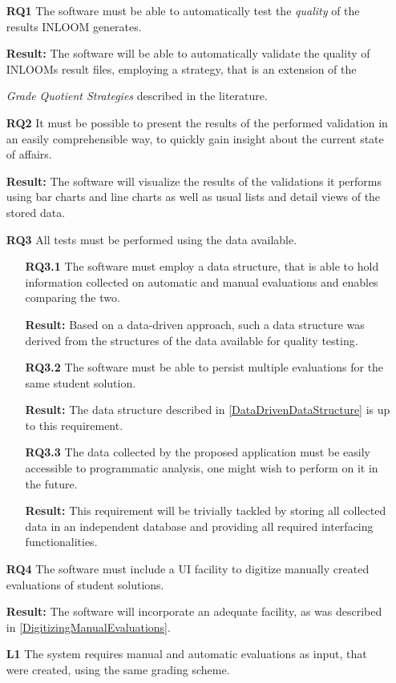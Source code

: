 \begin{itemize}
    \item[\textbf{RQ1}] The software must be able to automatically test the \textit{quality} 
    of the results INLOOM generates.

    \textbf{Result:} The software will be able to automatically validate the quality of 
    INLOOMs result files, employing a strategy, that is an extension of the 

    \textit{Grade Quotient Strategies} described in the literature.
    \item[\textbf{RQ2}] It must be possible to present the results of the performed validation
    in an easily comprehensible way, to quickly gain insight about the current state of affairs.

    \textbf{Result:} The software will visualize the results of the validations it performs
    using bar charts and line charts as well as usual lists and detail views of the stored 
    data.

    \item[\textbf{RQ3}] All tests must be performed using the data available.

    \begin{itemize}

        \item[\textbf{RQ3.1}] The software must employ a data structure, that is able to hold
        information collected on automatic and manual evaluations and enables comparing the two.

        \textbf{Result:} Based on a data-driven approach, such a data structure was derived from 
        the structures of the data available for quality testing.

        \item[\textbf{RQ3.2}] The software must be able to persist multiple evaluations for the 
        same student solution. 
        
        \textbf{Result:} The data structure described in \ref{DataDrivenDataStructure} is up 
        to this requirement.

        \item[\textbf{RQ3.3}] The data collected by the proposed application must be easily 
        accessible to programmatic analysis, one might wish to perform on it in the future.

        \textbf{Result:} This requirement will be trivially tackled by storing all collected 
        data in an independent database and providing all required interfacing functionalities.

    \end{itemize}

    \item[\textbf{RQ4}] The software must include a UI facility to digitize manually created 
    evaluations of student solutions. 

    \textbf{Result:} The software will incorporate an adequate facility, as was described in
    \ref{DigitizingManualEvaluations}.

    \item[\textbf{L1}] The system requires manual and automatic evaluations as input, that were
    created, using the same grading scheme.
\end{itemize}
